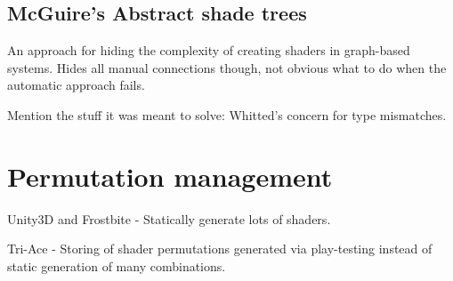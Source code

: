 \subsection{McGuire's Abstract shade trees}

An approach for hiding the complexity of creating shaders in graph-based systems. Hides all manual connections though, not obvious what to do when the automatic approach fails.

Mention the stuff it was meant to solve: Whitted's concern for type mismatches.

\section{Permutation management}

Unity3D and Frostbite - Statically generate lots of shaders.

Tri-Ace - Storing of shader permutations generated via play-testing instead of static generation of many combinations.
